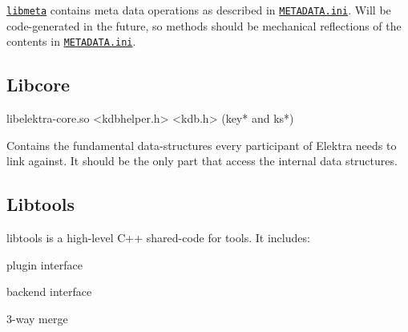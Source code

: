 \href{/home/markus/Projekte/Elektra/current/src/libs/meta/meta.c}{\tt libmeta} contains meta data operations as described in \href{/home/markus/Projekte/Elektra/current/doc/METADATA.ini}{\tt M\+E\+T\+A\+D\+A\+T\+A.\+ini}. Will be code-\/generated in the future, so methods should be mechanical reflections of the contents in \href{/home/markus/Projekte/Elektra/current/doc/METADATA.ini}{\tt M\+E\+T\+A\+D\+A\+T\+A.\+ini}.

\subsection*{Libcore}

\begin{DoxyVerb}libelektra-core.so
<kdbhelper.h>
<kdb.h> (key* and ks*)
\end{DoxyVerb}


Contains the fundamental data-\/structures every participant of Elektra needs to link against. It should be the only part that access the internal data structures.

\subsection*{Libtools}

libtools is a high-\/level C++ shared-\/code for tools. It includes\+:


\begin{DoxyItemize}
\item plugin interface
\item backend interface
\item 3-\/way merge 
\end{DoxyItemize}